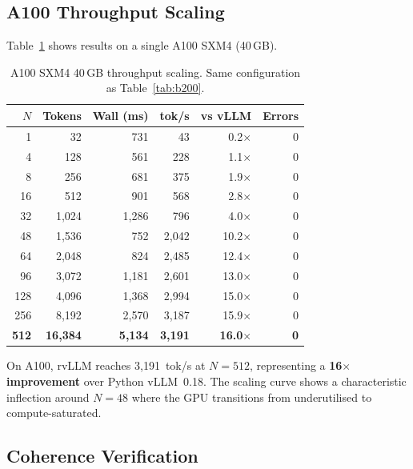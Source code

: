 \documentclass[11pt,a4paper]{article}
\newcommand{\thead}[1]{\textbf{\color{white}#1}}
\begin{document}
\subsection{A100 Throughput Scaling}

Table~\ref{tab:a100} shows results on a single A100 SXM4 (40\,GB).

\begin{table}[t]
  \centering
  \caption{A100 SXM4 40\,GB throughput scaling. Same configuration as Table~\ref{tab:b200}.}
  \label{tab:a100}
  \small
  \begin{tabular}{@{}rrrrrr@{}}
    \toprule
    \rowcolor{HeaderBlue} \thead{$N$} & \thead{Tokens} & \thead{Wall (ms)} & \thead{tok/s} & \thead{vs vLLM} & \thead{Errors} \\
    \midrule
    1    & 32       & 731     & 43     & 0.2$\times$ & 0 \\
    \rowcolor{gray!8}
    4    & 128      & 561     & 228    & 1.1$\times$ & 0 \\
    8    & 256      & 681     & 375    & 1.9$\times$ & 0 \\
    \rowcolor{gray!8}
    16   & 512      & 901     & 568    & 2.8$\times$ & 0 \\
    32   & 1{,}024  & 1{,}286 & 796    & 4.0$\times$ & 0 \\
    \rowcolor{gray!8}
    48   & 1{,}536  & 752     & 2{,}042 & 10.2$\times$ & 0 \\
    64   & 2{,}048  & 824     & 2{,}485 & 12.4$\times$ & 0 \\
    \rowcolor{gray!8}
    96   & 3{,}072  & 1{,}181 & 2{,}601 & 13.0$\times$ & 0 \\
    128  & 4{,}096  & 1{,}368 & 2{,}994 & 15.0$\times$ & 0 \\
    \rowcolor{gray!8}
    256  & 8{,}192  & 2{,}570 & 3{,}187 & 15.9$\times$ & 0 \\
    \textbf{512} & \textbf{16{,}384} & \textbf{5{,}134} & \textbf{3{,}191} & \textbf{16.0$\times$} & \textbf{0} \\
    \bottomrule
  \end{tabular}
\end{table}

On A100, rvLLM reaches 3{,}191~tok/s at $N\!=\!512$, representing a
\textbf{16$\times$ improvement} over Python vLLM~0.18. The scaling curve shows
a characteristic inflection around $N\!=\!48$ where the GPU transitions from
underutilised to compute-saturated.

\subsection{Coherence Verification}
\end{document}
